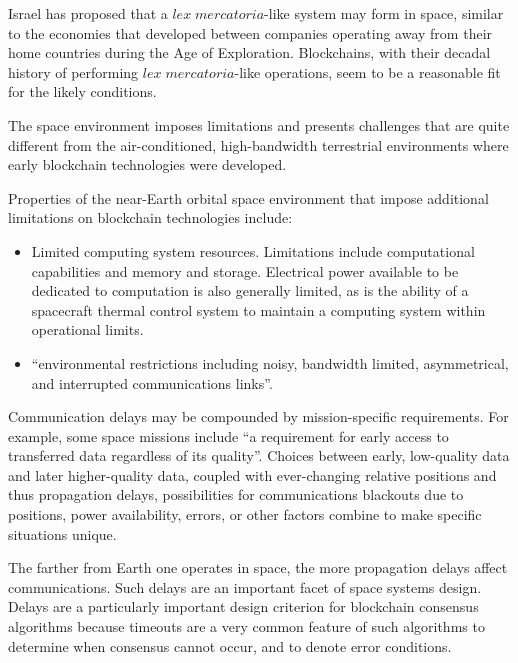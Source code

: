 \documentclass[]{aiaa-tc}%
\begin{document}
Israel has proposed that a $\mathit{lex\; mercatoria}$-like system may form in space, similar to the economies that developed between companies operating away from their home countries during the Age of Exploration\cite{israel_space_2019}. Blockchains, with their decadal history of performing $\mathit{lex\; mercatoria}$-like operations, seem to be a reasonable fit for the likely conditions.

The space environment imposes limitations and presents challenges that are quite different from the air-conditioned, high-bandwidth terrestrial environments where early blockchain technologies were developed.

Properties of the near-Earth orbital space environment that impose additional limitations on blockchain technologies include:
\begin{itemize}
\item Limited computing system resources. Limitations include computational capabilities and memory\cite{CCSDS_2007} and storage\cite{yu_blockchain_2019}. Electrical power available to be dedicated to computation is also generally limited, as is the ability of a spacecraft thermal control system to maintain a computing system within operational limits.
\item ``environmental restrictions including noisy, bandwidth limited, asymmetrical, and interrupted communications links''\cite{CCSDS_2007}.
\end{itemize}

Communication delays may be compounded by mission-specific requirements. For example, some space missions include ``a requirement for early access to transferred data regardless of its quality''\cite{CCSDS_2007}. Choices between early, low-quality data and later higher-quality data, coupled with ever-changing relative positions and thus propagation delays, possibilities for communications blackouts due to positions, power availability, errors, or other factors combine to make specific situations unique.

The farther from Earth one operates in space, the more propagation delays affect communications. Such delays are an important facet of space systems design\cite{CCSDS_2007,yu_blockchain_2019}. Delays are a particularly important design criterion for blockchain consensus algorithms because timeouts are a very common feature of such algorithms to determine when consensus cannot occur, and to denote error conditions.
\end{document}
